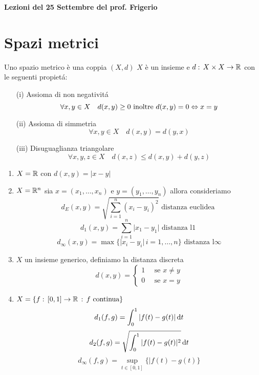  

\textbf{Lezioni del 25  Settembre del prof. Frigerio}
\section{Spazi metrici}

\begin{defn}\bianco
Uno spazio metrico \`e una coppia $(X,d)$
$X$ \`e un insieme e $d:\, X \times X \to \mathbb{R}$ con le seguenti propiet\'a:
\begin{itemize}
	\item[(i)] Assioma di non negativit\'a
	$$\forall x,y \in X \quad d(x,y) \geq 0 \text{ inoltre  }  d(x,y)=0 \Leftrightarrow x=y$$
	\item[(ii)] Assioma di simmetria
	$$ \forall x,y \in X \quad d(x,y)=d(y,x)$$
	\item[(iii)] Disuguaglianza triangolare
	$$ \forall x,y,z\in X \quad d(x,z)\leq d(x,y)+d(y,z)$$
	
\end{itemize}	
\end{defn}

\begin{enumerate}
	\item $X=\mathbb{R}$ con $d(x,y)=\vert x - y \vert $
	\item $X=\mathbb{R}^n$ sia $x=(x_1, \dots, x_n ) $ e $y=(y_1, \dots, y_n)$ allora consideriamo
	 $$ d_E(x,y)=\sqrt{ \sum_{i=1}^n (x_i-y_i)^2} \text{ distanza euclidea }$$
	 $$ d_1(x,y)= \sum_{i=1}^n \vert x_1 -y_1 \vert \text{ distanza l1 } $$
	 $$ d_\infty(x,y) = \max\{ \vert x_i - y_i \vert  \, i=1,\dots, n \} 	\text{ distanza l}\infty$$
	 \item $X$ un insieme generico, definiamo la distanza discreta
	 $$ d(x,y)=\begin{cases}
	 	1 \quad \text{ se } x\neq y \\
	 	0 \quad \text{ se } x=y 
	 \end{cases}$$
	 \item $X=\{ f:\, [0,1] \to \mathbb{R} \, : \, f \text{ continua} \}$
	 $$ d_1(f,g) = \int_0^1 \vert f(t)- g(t)\vert \, \mathrm{d}t $$
	 $$ d_2(f,g)=  \sqrt{ \int_0^1 \vert f(t)-g(t)\vert^2 } \, \mathrm{d}t$$
	 $$ d_\infty(f,g)= \sup_{t\in[0,1]} \{ \vert f(t)-g(t)\}$$
	 
	\end{enumerate}	

